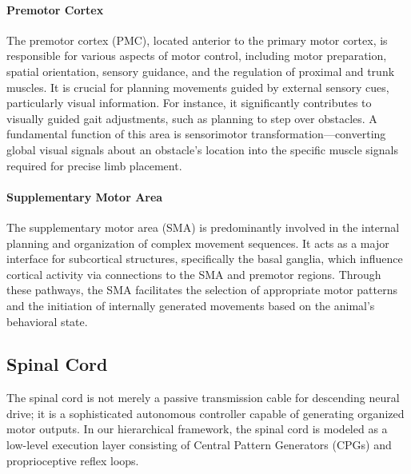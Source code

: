 \documentclass[lettersize,journal]{IEEEtran}
\begin{document}
\paragraph{Premotor Cortex} The premotor cortex (PMC), located anterior to the primary motor cortex, is responsible for various aspects of motor control, including motor preparation, spatial orientation, sensory guidance, and the regulation of proximal and trunk muscles. 
It is crucial for planning movements guided by external sensory cues, particularly visual information. 
For instance, it significantly contributes to visually guided gait adjustments, such as planning to step over obstacles. 
A fundamental function of this area is sensorimotor transformation—converting global visual signals about an obstacle's location into the specific muscle signals required for precise limb placement.

\paragraph{Supplementary Motor Area} The supplementary motor area (SMA) is predominantly involved in the internal planning and organization of complex movement sequences. 
It acts as a major interface for subcortical structures, specifically the basal ganglia, which influence cortical activity via connections to the SMA and premotor regions. 
Through these pathways, the SMA facilitates the selection of appropriate motor patterns and the initiation of internally generated movements based on the animal's behavioral state.

\subsection{Spinal Cord}
The spinal cord is not merely a passive transmission cable for descending neural drive; it is a sophisticated autonomous controller capable of generating organized motor outputs. 
In our hierarchical framework, the spinal cord is modeled as a low-level execution layer consisting of Central Pattern Generators (CPGs) and proprioceptive reflex loops.
\end{document}
